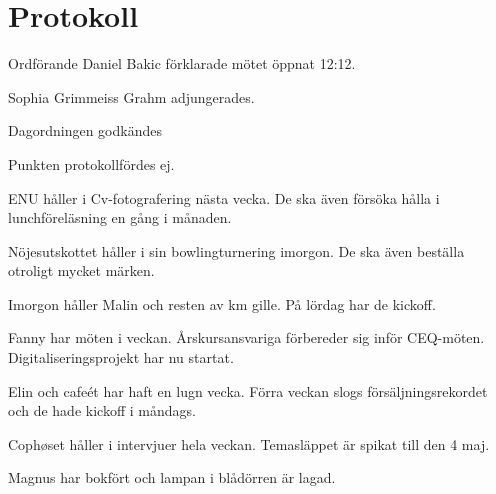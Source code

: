 \documentclass[10pt]{article}
\def\mo{Daniel Bakic}
\begin{document}
\section*{Protokoll}
\begin{paragrafer}
Ordförande {\mo} förklarade mötet öppnat 12:12.

{\valavmo}

{\valavms}

{\valavj}

{\tosg}


Sophia Grimmeiss Grahm adjungerades.


Dagordningen godkändes




\begin{fyllnadsval} %
\end{fyllnadsval}

\begin{paragrafer}
Punkten protokollfördes ej.

ENU håller i Cv-fotografering nästa vecka. De ska även försöka hålla i lunchföreläsning en gång i månaden.

Nöjesutskottet håller i sin bowlingturnering imorgon. De ska även beställa otroligt mycket märken.

Imorgon håller Malin och resten av km gille. På lördag har de kickoff.

Fanny har möten i veckan. Årskursansvariga förbereder sig inför CEQ-möten. Digitaliseringsprojekt har nu startat.

Elin och cafeét har haft en lugn vecka. Förra veckan slogs försäljningsrekordet och de hade kickoff i måndags.

Cophøset håller i intervjuer hela veckan. Temasläppet är spikat till den 4 maj.

Magnus har bokfört och lampan i blådörren är lagad.


\end{paragrafer}
\end{paragrafer}
\end{document}
